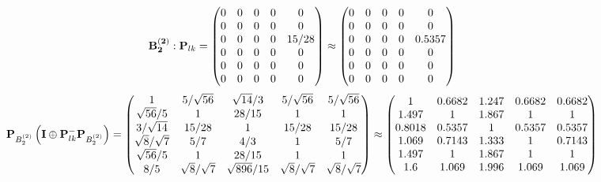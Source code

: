 \documentclass[10pt,a4paper]{article}
\begin{document}
	\[
		\bold{B_2^{(2)}}: \bold{P}_{lk} = 
		\begin{pmatrix}
			{{0}}{} & {{0}}{} & {{0}}{} & {{0}}{} & {{0}}{} \\
			{{0}}{} & {{0}}{} & {{0}}{} & {{0}}{} & {{0}}{} \\
			{{0}}{} & {{0}}{} & {{0}}{} & {{0}}{} & {{15}} / {{28}} \\
			{{0}}{} & {{0}}{} & {{0}}{} & {{0}}{} & {{0}}{} \\
			{{0}}{} & {{0}}{} & {{0}}{} & {{0}}{} & {{0}}{} \\
			{{0}}{} & {{0}}{} & {{0}}{} & {{0}}{} & {{0}}{} \\
		\end{pmatrix}
		\approx
		\begin{pmatrix}
			0        & 0        & 0        & 0        & 0        \\
			0        & 0        & 0        & 0        & 0        \\
			0        & 0        & 0        & 0        & 0.5357   \\
			0        & 0        & 0        & 0        & 0        \\
			0        & 0        & 0        & 0        & 0        \\
			0        & 0        & 0        & 0        & 0        \\
		\end{pmatrix}
	\]
	\[
		\bold{P}_{B_2^{(2)}}\left(\bold{I} \oplus \bold{P}_{lk}^{-}\bold{P}_{B_2^{(2)}}\right) = 
		\begin{pmatrix}
			{1}{} & {{5}} / {\sqrt{56}} & {\sqrt{14}} / {{3}} & {{5}} / {\sqrt{56}} & {{5}} / {\sqrt{56}} \\
			{\sqrt{56}} / {{5}} & {1}{} & {{28}} / {{15}} & {1}{} & {1}{} \\
			{{3}} / {\sqrt{14}} & {{15}} / {{28}} & {1}{} & {{15}} / {{28}} & {{15}} / {{28}} \\
			{\sqrt{8}} / {\sqrt{7}} & {{5}} / {{7}} & {{4}} / {{3}} & {1}{} & {{5}} / {{7}} \\
			{\sqrt{56}} / {{5}} & {1}{} & {{28}} / {{15}} & {1}{} & {1}{} \\
			{{8}} / {{5}} & {\sqrt{8}} / {\sqrt{7}} & {\sqrt{896}} / {{15}} & {\sqrt{8}} / {\sqrt{7}} & {\sqrt{8}} / {\sqrt{7}} \\
		\end{pmatrix}
		\approx
		\begin{pmatrix}
			1        & 0.6682   & 1.247    & 0.6682   & 0.6682   \\
			1.497    & 1        & 1.867    & 1        & 1        \\
			0.8018   & 0.5357   & 1        & 0.5357   & 0.5357   \\
			1.069    & 0.7143   & 1.333    & 1        & 0.7143   \\
			1.497    & 1        & 1.867    & 1        & 1        \\
			1.6      & 1.069    & 1.996    & 1.069    & 1.069    \\
		\end{pmatrix}
	\]
\end{document}
